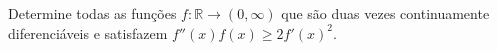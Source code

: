 Determine todas as funções \(f\colon  \mathbb{R} \to (0, \infty)\) que são duas vezes continuamente diferenciáveis e satisfazem \(f''(x)f(x) \ge 2f'(x)^2.\)
